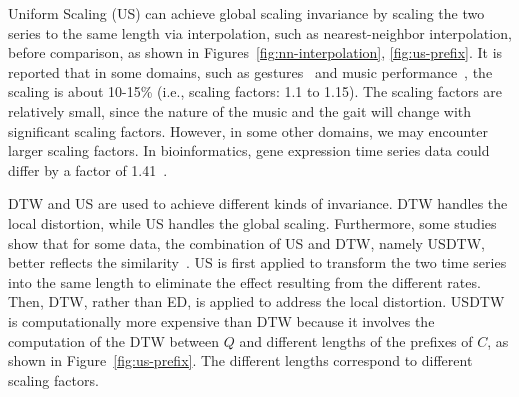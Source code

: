 

Uniform Scaling (US) can achieve global scaling invariance by scaling the two series to the same length via interpolation, such as nearest-neighbor interpolation, before comparison, as shown in Figures~\ref{fig:nn-interpolation}, \ref{fig:us-prefix}.
It is reported that in some domains, such as gestures~\cite{rose1996efficient, li2002motion} and music performance~\cite{dannenberg2004musart}, the scaling is about 10-15\% (i.e., scaling factors: 1.1 to 1.15). 
The scaling factors are relatively small, since the nature of the music and the gait will change with significant scaling factors. 
However, in some other domains, we may encounter larger scaling factors.
In bioinformatics, gene expression time series data could differ by a factor of 1.41~\cite{li2002simple, batista2014cid}.

DTW and US are used to achieve different kinds of invariance. 
DTW handles the local distortion, while US handles the global scaling.
Furthermore, some studies show that for some data, the combination of US and DTW, namely USDTW, better reflects the similarity~\cite{fu2008scaling, shen2017searching, shen2018accelerating}. 
US is first applied to transform the two time series into the same length to eliminate the effect resulting from the different rates. Then, DTW, rather than ED, is applied to address the local distortion.
USDTW is computationally more expensive than DTW because it involves the computation of the DTW between $Q$ and different lengths of the prefixes of $C$, as shown in Figure~\ref{fig:us-prefix}. 
The different lengths correspond to different scaling factors.

